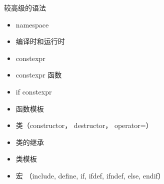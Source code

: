 较高级的语法
\begin{itemize}
\item namespace
\item 编译时和运行时
\item constexpr
\item constexpr 函数
\item if constexpr
\item 函数模板
\item 类（constructor， destructor， operator=）
\item 类的继承
\item 类模板
\item 宏 （include, define, if, ifdef, ifndef, else, endif）
\end{itemize}
